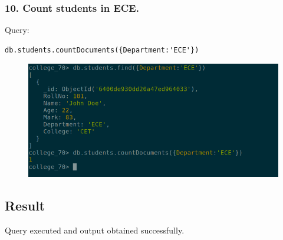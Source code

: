 \documentclass{article}
\begin{document}
\subsubsection*{10. Count students in ECE.}
Query:
\begin{Verbatim}[frame=single,framerule=1pt,fontfamily=courier,fontsize=\small]
db.students.countDocuments({Department:'ECE'})
\end{Verbatim}
\begin{figure}[H]
    \centering
    \includegraphics[width=\textwidth]{cycle7/7.10.png}
\end{figure}

\subsection*{Result}
Query executed and output obtained successfully.
\end{document}

